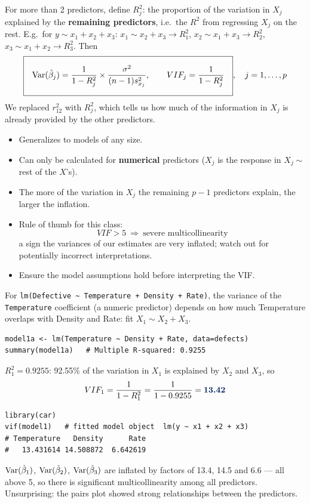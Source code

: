 \begin{definition}
    For more than 2 predictors, define $R_j^2$: the proportion of the variation in $X_j$ explained
    by the \textbf{remaining predictors}, i.e.\ the $R^2$ from regressing $X_j$ on the rest.
    E.g.\ for $y\sim x_1+x_2+x_3$: $x_1\sim x_2+x_3\to R_1^2$, $x_2\sim x_1+x_3\to R_2^2$,
    $x_3\sim x_1+x_2\to R_3^2$. Then
    \[\boxed{\Var(\hat\beta_j)=\frac{1}{1-R_j^2}\times\frac{\sigma^2}{(n-1)s_{x_j}^2},\qquad VIF_j=\frac{1}{1-R_j^2}},\quad j=1,\dots,p\]
    We replaced $r_{12}^2$ with $R_j^2$, which tells us how much of the information in $X_j$ is
    already provided by the other predictors.
\end{definition}

\begin{remark}
    \begin{itemize}
        \item Generalizes to models of any size.
        \item Can only be calculated for \textbf{numerical} predictors ($X_j$ is the response in
        $X_j\sim$ rest of the $X$'s).
        \item The more of the variation in $X_j$ the remaining $p-1$ predictors explain, the larger
        the inflation.
        \item Rule of thumb for this class: \[\boxed{VIF>5\ \Rightarrow\ \text{severe multicollinearity}}\]
        a sign the variances of our estimates are very inflated; watch out for potentially
        incorrect interpretations.
        \item Ensure the model assumptions hold before interpreting the VIF.
    \end{itemize}
\end{remark}

\begin{example}
    For \texttt{lm(Defective \textasciitilde{} Temperature + Density + Rate)}, the variance of the
    \texttt{Temperature} coefficient (a numeric predictor) depends on how much Temperature overlaps
    with Density and Rate: fit $X_1\sim X_2+X_3$.
\begin{verbatim}
model1a <- lm(Temperature ~ Density + Rate, data=defects)
summary(model1a)   # Multiple R-squared: 0.9255
\end{verbatim}
    $R_1^2=0.9255$: 92.55\% of the variation in $X_1$ is explained by $X_2$ and $X_3$, so
    \[VIF_1=\frac1{1-R_1^2}=\frac1{1-0.9255}=\dbb{13.42}\]
\begin{verbatim}
library(car)
vif(model1)   # fitted model object  lm(y ~ x1 + x2 + x3)
# Temperature   Density      Rate
#   13.431614 14.508872  6.642619
\end{verbatim}
    $\operatorname{Var}(\hat\beta_1)$, $\operatorname{Var}(\hat\beta_2)$, $\operatorname{Var}(\hat\beta_3)$ are inflated by factors of 13.4,
    14.5 and 6.6 --- all above 5, so there is significant multicollinearity among all predictors.
    Unsurprising: the pairs plot showed strong relationships between the predictors.
\end{example}

